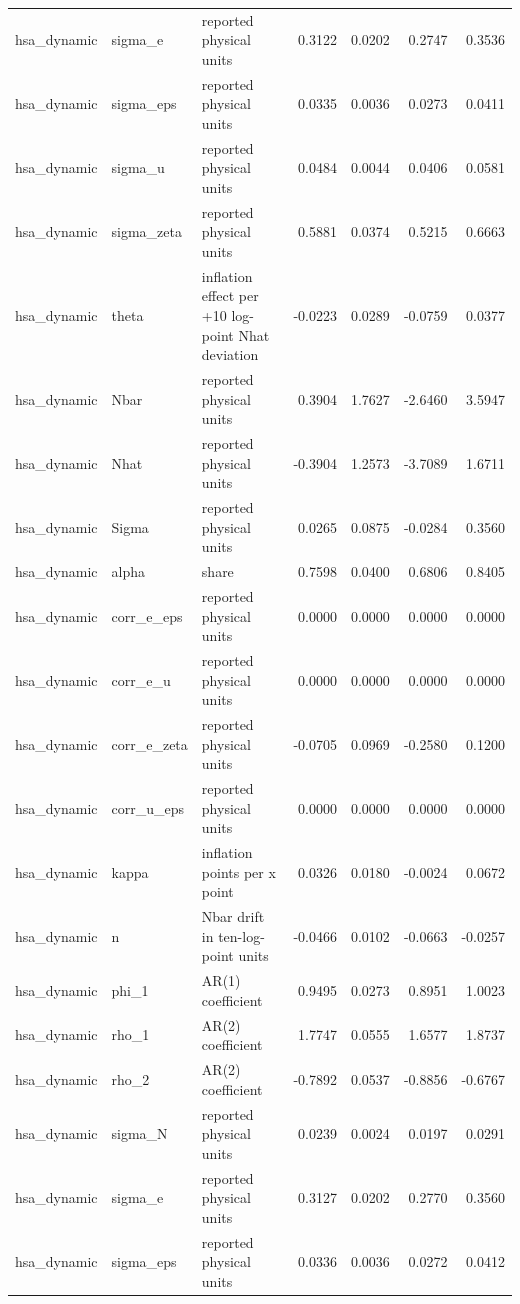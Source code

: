 \begin{tabular}{lllrrrr}
hsa\_dynamic & sigma\_e & reported physical units & 0.3122 & 0.0202 & 0.2747 & 0.3536 \\
hsa\_dynamic & sigma\_eps & reported physical units & 0.0335 & 0.0036 & 0.0273 & 0.0411 \\
hsa\_dynamic & sigma\_u & reported physical units & 0.0484 & 0.0044 & 0.0406 & 0.0581 \\
hsa\_dynamic & sigma\_zeta & reported physical units & 0.5881 & 0.0374 & 0.5215 & 0.6663 \\
hsa\_dynamic & theta & inflation effect per +10 log-point Nhat deviation & -0.0223 & 0.0289 & -0.0759 & 0.0377 \\
hsa\_dynamic & Nbar & reported physical units & 0.3904 & 1.7627 & -2.6460 & 3.5947 \\
hsa\_dynamic & Nhat & reported physical units & -0.3904 & 1.2573 & -3.7089 & 1.6711 \\
hsa\_dynamic & Sigma & reported physical units & 0.0265 & 0.0875 & -0.0284 & 0.3560 \\
hsa\_dynamic & alpha & share & 0.7598 & 0.0400 & 0.6806 & 0.8405 \\
hsa\_dynamic & corr\_e\_eps & reported physical units & 0.0000 & 0.0000 & 0.0000 & 0.0000 \\
hsa\_dynamic & corr\_e\_u & reported physical units & 0.0000 & 0.0000 & 0.0000 & 0.0000 \\
hsa\_dynamic & corr\_e\_zeta & reported physical units & -0.0705 & 0.0969 & -0.2580 & 0.1200 \\
hsa\_dynamic & corr\_u\_eps & reported physical units & 0.0000 & 0.0000 & 0.0000 & 0.0000 \\
hsa\_dynamic & kappa & inflation points per x point & 0.0326 & 0.0180 & -0.0024 & 0.0672 \\
hsa\_dynamic & n & Nbar drift in ten-log-point units & -0.0466 & 0.0102 & -0.0663 & -0.0257 \\
hsa\_dynamic & phi\_1 & AR(1) coefficient & 0.9495 & 0.0273 & 0.8951 & 1.0023 \\
hsa\_dynamic & rho\_1 & AR(2) coefficient & 1.7747 & 0.0555 & 1.6577 & 1.8737 \\
hsa\_dynamic & rho\_2 & AR(2) coefficient & -0.7892 & 0.0537 & -0.8856 & -0.6767 \\
hsa\_dynamic & sigma\_N & reported physical units & 0.0239 & 0.0024 & 0.0197 & 0.0291 \\
hsa\_dynamic & sigma\_e & reported physical units & 0.3127 & 0.0202 & 0.2770 & 0.3560 \\
hsa\_dynamic & sigma\_eps & reported physical units & 0.0336 & 0.0036 & 0.0272 & 0.0412 \\

\end{tabular}
